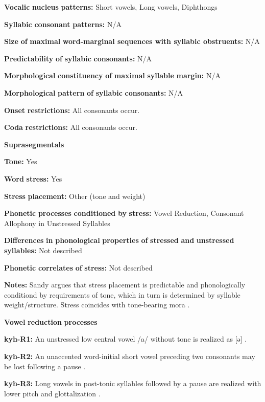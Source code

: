 \textbf{Vocalic} \textbf{nucleus} \textbf{patterns:} Short vowels, Long vowels, Diphthongs

\textbf{Syllabic} \textbf{consonant} \textbf{patterns:} N/A

\textbf{Size} \textbf{of} \textbf{maximal} \textbf{word{}-marginal sequences with syllabic obstruents:} N/A

\textbf{Predictability} \textbf{of} \textbf{syllabic} \textbf{consonants:} N/A

\textbf{Morphological} \textbf{constituency} \textbf{of} \textbf{maximal} \textbf{syllable} \textbf{margin:} N/A

\textbf{Morphological} \textbf{pattern} \textbf{of} \textbf{syllabic} \textbf{consonants:} N/A

\textbf{Onset} \textbf{restrictions:} All consonants occur.

\textbf{Coda} \textbf{restrictions:} All consonants occur.

\textbf{Suprasegmentals}

\textbf{Tone:} Yes

\textbf{Word} \textbf{stress:} Yes

\textbf{Stress} \textbf{placement:} Other (tone and weight)

\textbf{Phonetic} \textbf{processes} \textbf{conditioned} \textbf{by} \textbf{stress:} Vowel Reduction, Consonant Allophony in Unstressed Syllables

\textbf{Differences} \textbf{in} \textbf{phonological} \textbf{properties} \textbf{of} \textbf{stressed} \textbf{and} \textbf{unstressed} \textbf{syllables:} Not described

\textbf{Phonetic} \textbf{correlates} \textbf{of} \textbf{stress:} Not described

\textbf{Notes:} Sandy argues that stress placement is predictable and phonologically conditiond by requirements of tone, which in turn is determined by syllable weight/structure. Stress coincides with tone-bearing mora \citep[40]{Sandy2014}.

\textbf{Vowel} \textbf{reduction} \textbf{processes}

\textbf{kyh-R1:} An unstressed low central vowel /a/ without tone is realized as [ə] \citep[11]{Bright1957}.

\textbf{kyh-R2:} An unaccented word-initial short vowel preceding two consonants may be lost following a pause \citep[53]{Bright1957}.

\textbf{kyh-R3:} Long vowels in post-tonic syllables followed by a pause are realized with lower pitch and glottalization \citep[13]{Bright1957}.

